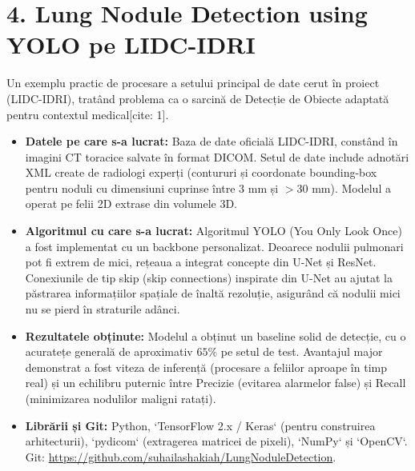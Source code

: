 \documentclass[runningheads,a4paper,11pt]{report}
\begin{document}
\section{4. Lung Nodule Detection using YOLO pe LIDC-IDRI}
Un exemplu practic de procesare a setului principal de date cerut în proiect (LIDC-IDRI), tratând problema ca o sarcină de Detecție de Obiecte adaptată pentru contextul medical[cite: 1].
\begin{itemize}
    \item \textbf{Datele pe care s-a lucrat:} Baza de date oficială LIDC-IDRI, constând în imagini CT toracice salvate în format DICOM. Setul de date include adnotări XML create de radiologi experți (contururi și coordonate bounding-box pentru noduli cu dimensiuni cuprinse între 3 mm și $>30$ mm). Modelul a operat pe felii 2D extrase din volumele 3D.
    \item \textbf{Algoritmul cu care s-a lucrat:} Algoritmul YOLO (You Only Look Once) a fost implementat cu un backbone personalizat. Deoarece nodulii pulmonari pot fi extrem de mici, rețeaua a integrat concepte din U-Net și ResNet. Conexiunile de tip skip (skip connections) inspirate din U-Net au ajutat la păstrarea informațiilor spațiale de înaltă rezoluție, asigurând că nodulii mici nu se pierd în straturile adânci.
    \item \textbf{Rezultatele obținute:} Modelul a obținut un baseline solid de detecție, cu o acuratețe generală de aproximativ $65\%$ pe setul de test. Avantajul major demonstrat a fost viteza de inferență (procesare a feliilor aproape în timp real) și un echilibru puternic între Precizie (evitarea alarmelor false) și Recall (minimizarea nodulilor maligni ratați).
    \item \textbf{Librării și Git:} Python, `TensorFlow 2.x / Keras` (pentru construirea arhitecturii), `pydicom` (extragerea matricei de pixeli), `NumPy` și `OpenCV`. Git: \url{https://github.com/suhailashakiah/LungNoduleDetection}.
\end{itemize}
\end{document}
